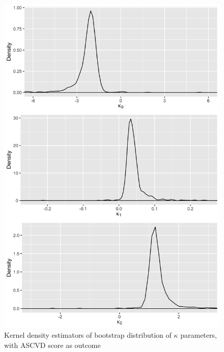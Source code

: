 \documentclass [12pt, proquest] {uwthesis}[2016/11/22]
\begin{document}
\begin{figure}
    \centering
    \includegraphics[width = 5.5 in]{PlotA_7.png}
    \caption{Kernel density estimators of bootstrap distribution of $\kappa$ parameters, with ASCVD score as outcome}
\end{figure}
\end{document}
